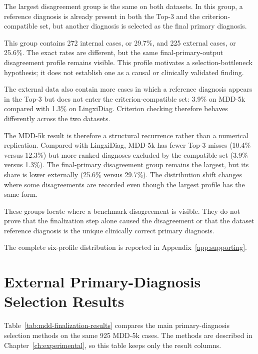 \documentclass[12pt,a4paper,oneside]{report}
\begin{document}
The largest disagreement group is the same on both datasets. In this
group, a reference diagnosis is already present in both the Top-3 and
the criterion-compatible set, but another diagnosis is selected as the
final primary diagnosis.

This group contains 272 internal cases, or 29.7\%, and 225 external
cases, or 25.6\%. The exact rates are different, but the same
final-primary-output disagreement profile remains visible. This profile
motivates a selection-bottleneck hypothesis; it does not establish one
as a causal or clinically validated finding.

The external data also contain more cases in which a reference diagnosis
appears in the Top-3 but does not enter the criterion-compatible set:
3.9\% on MDD-5k compared with 1.3\% on LingxiDiag. Criterion checking
therefore behaves differently across the two datasets.

The MDD-5k result is therefore a structural recurrence rather than a
numerical replication. Compared with LingxiDiag, MDD-5k has fewer Top-3
misses (10.4\% versus 12.3\%) but more ranked diagnoses excluded by the
compatible set (3.9\% versus 1.3\%). The final-primary disagreement
group remains the largest, but its share is lower externally (25.6\%
versus 29.7\%). The distribution shift changes where some disagreements
are recorded even though the largest profile has the same form.

These groups locate where a benchmark disagreement is visible. They do
not prove that the finalization step alone caused the disagreement or
that the dataset reference diagnosis is the unique clinically correct
primary diagnosis.

The complete six-profile distribution is reported in
Appendix~\ref{app:supporting}.

\section{External Primary-Diagnosis Selection Results}
\label{sec:mdd-multiway}

Table~\ref{tab:mdd-finalization-results} compares the main
primary-diagnosis selection methods on the same 925 MDD-5k cases.
The methods are described in Chapter~\ref{ch:experimental}, so this table
keeps only the result columns.
\end{document}
